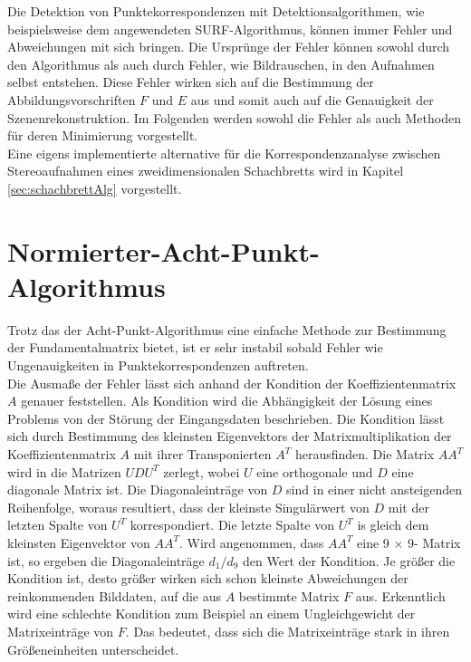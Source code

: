 Die Detektion von Punktekorrespondenzen mit Detektionsalgorithmen, wie beispielsweise dem angewendeten SURF-Algorithmus, können immer Fehler und Abweichungen mit sich bringen. Die Ursprünge der Fehler können sowohl durch den Algorithmus als auch durch Fehler, wie Bildrauschen, in den Aufnahmen selbst entstehen. Diese Fehler wirken sich auf die Bestimmung der Abbildungsvorschriften $F$ und $E$ aus und somit auch auf die Genauigkeit der Szenenrekonstruktion\cite{HZ}. Im Folgenden werden sowohl die Fehler als auch Methoden für deren Minimierung vorgestellt.\\

Eine eigens implementierte alternative für die Korrespondenzanalyse zwischen Stereoaufnahmen eines zweidimensionalen Schachbretts wird in Kapitel \ref{sec:schachbrettAlg} vorgestellt.  

\section{Normierter-Acht-Punkt-Algorithmus}

Trotz das der Acht-Punkt-Algorithmus eine einfache Methode zur Bestimmung der Fundamentalmatrix bietet, ist er sehr instabil sobald Fehler wie Ungenauigkeiten in Punktekorrespondenzen  auftreten\cite{HZ,Brooks}.\\

Die Ausmaße der Fehler lässt sich anhand der Kondition der Koeffizientenmatrix $A$ genauer feststellen. Als Kondition wird die Abhängigkeit der Lösung eines Problems von der Störung der Eingangsdaten beschrieben\cite{HZ8,ConditionNumber,Manocha}. Die Kondition lässt sich durch Bestimmung des kleinsten Eigenvektors der Matrixmultiplikation der Koeffizientenmatrix $A$ mit ihrer Transponierten $A^T$ herausfinden. Die Matrix $AA^T$ wird in die Matrizen $UDU^T$ zerlegt, wobei $U$ eine orthogonale und $D$ eine diagonale Matrix ist. Die Diagonaleinträge von $D$ sind in einer nicht ansteigenden Reihenfolge, woraus resultiert, dass der kleinste Singulärwert von $D$ mit der letzten Spalte von $U^T$ korrespondiert. Die letzte Spalte von $U^T$ is gleich dem kleinsten Eigenvektor von $AA^T$\cite{HZ8,ConditionNumber}. Wird angenommen, dass $AA^T$ eine 9 $\times$ 9- Matrix ist, so ergeben die Diagonaleinträge $d_1/d_9$ den Wert der Kondition. Je größer die Kondition ist, desto größer wirken sich schon kleinste Abweichungen der reinkommenden Bilddaten, auf die aus $A$ bestimmte Matrix $F$ aus. Erkenntlich wird eine schlechte Kondition zum Beispiel an einem Ungleichgewicht der Matrixeinträge von $F$\cite{HZ8}. Das bedeutet, dass sich die Matrixeinträge stark in ihren Größeneinheiten unterscheidet. \\

